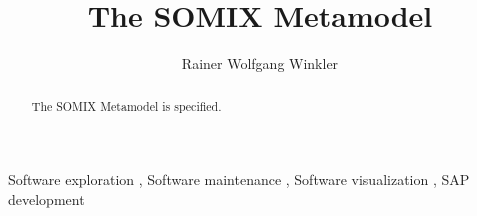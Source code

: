\documentclass[preprint,12pt]{elsarticle}
\begin{document}
\begin{frontmatter}



\title{The SOMIX Metamodel}


\author[1]{Rainer Wolfgang Winkler%
}
\address[1]{CubeServ GmbH, Am Prime-Parc 4, 65479 Raunheim, Germany}



\begin{abstract}

The SOMIX Metamodel is specified.

\end{abstract}


\begin{keyword}

Software exploration \sep
Software maintenance \sep
Software visualization \sep
SAP development



\end{keyword}

\end{frontmatter}
\end{document}
